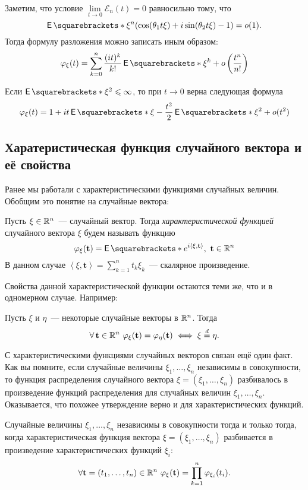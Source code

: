 \begin{remark}
	Заметим, что условие \(\lim\limits_{t \to 0} \mathcal{E}_n(t) = 0\) равносильно тому, что
	\[
		\E{\xi^{n}(\cos(\theta_1 t\xi) + i\sin(\theta_2 t\xi) - 1)} = o(1).
	\]
	Тогда формулу разложения можно записать иным образом:
	\[
		\phi_{\xi}(t) = \sum_{k = 0}^{n} \frac{(it)^k}{k!}\E{\xi^k} + o\left(\frac{t^n}{n!}\right)
	\]
\end{remark}
\begin{consequence}
	Если \(\E{\xi^2} \leq \infty\), то при \(t \to 0\) верна следующая формула
	\[
		\phi_{\xi}(t) = 1 + it\E{\xi} - \frac{t^2}{2}\E{\xi^2} + o(t^2)
	\]
\end{consequence}

\subsection{Харатеристическая функция случайного вектора и её свойства}
Ранее мы работали с характеристическими функциями случайных величин. Обобщим это понятие на случайные вектора:
\begin{definition}
	Пусть \(\xi \in \mathbb{R}^n\)~--- случайный вектор. Тогда \emph{характеристической функцией} случайного вектора \(\xi\) будем называть функцию
	\[
		\phi_{\xi}(\mathbf{t}) = \E{e^{i\left\langle\xi, \mathbf{t}\right\rangle}},\ \mathbf{t} \in \R^n
	\]
	В данном случае \(\left\langle\xi, \mathbf{t}\right\rangle = \sum_{k = 1}^{n} t_k\xi_k\)~--- скалярное произведение.
\end{definition}
Свойства данной характеристической функции остаются теми же, что и в одномерном случае. Например:
\begin{theorem}[единственности]
	Пусть \(\xi\) и \(\eta\)~--- некоторые случайные векторы в \(\mathbb{R}^n\). Тогда
	\[
		\forall\,\mathbf{t} \in \R^n\ \phi_{\xi}(\mathbf{t}) = \phi_{\eta}(\mathbf{t}) \iff \xi \eqdist \eta.
	\]
\end{theorem}
С характеристическими функциями случайных векторов связан ещё один факт. Как вы помните, если случайные величины \(\xi_{1}, \dots, \xi_{n}\) независимы в совокупности, то функция распределения случайного вектора \(\xi = (\xi_1, \dots, \xi_n)\) разбивалось в произведение функций распределения для случайных величин \(\xi_{1}, \dots, \xi_{n}\). Оказывается, что похожее утверждение верно и для характеристических функций.
\begin{theorem}
	Случайные величины \(\xi_{1}, \dots, \xi_{n}\) независимы в совокупности тогда и только тогда, когда характеристическая функция вектора \(\xi = (\xi_{1}, \dots, \xi_{n})\) разбивается в произведение характеристических функций \(\xi_{i}\):
	\[
		\forall \mathbf{t} = (t_1, \dots, t_n) \in \mathbb{R}^n\ \varphi_{\xi}(\mathbf{t}) = \prod_{k = 1}^{n} \varphi_{\xi_i}(t_i).
	\]
\end{theorem}

